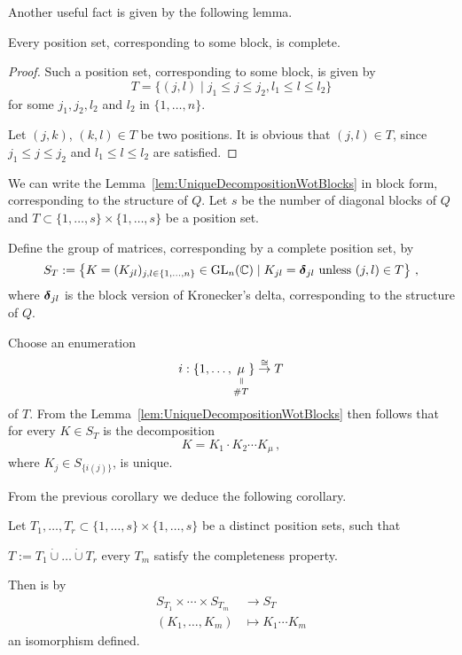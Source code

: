 Another useful fact is given by the following lemma.
\begin{lem}
  Every position set, corresponding to some block, is complete.
\end{lem}
\begin{proof}
  Such a position set, corresponding to some block, is given by
  \[
    T=\{(j,l)\mid j_1\leq j\leq j_2, l_1\leq l\leq l_2\}
  \]
  for some $j_1,j_2,l_2$ and $l_2$ in $\{1,\dots,n\}$.

  Let $(j,k)$, $(k,l)\in T$ be two positions.
  It is obvious that $(j,l)\in T$, since $j_1\leq j\leq j_2$ and
  $l_1\leq l\leq l_2$ are satisfied.
\end{proof}
\begin{cor}
  We can write the Lemma~\ref{lem:UniqueDecompositionWotBlocks} in block form,
  corresponding to the structure of $Q$.
  Let $s$ be the number of diagonal blocks of $Q$ and
  $T\subset\{1,\dots,s\}\times\{1,\dots,s\}$ be a position set.
  \begin{s-defn}
    Define the group of matrices, corresponding by a complete position set, by
    \[
      S_T:=\left\{K=(K_{jl})_{j,l\in\{1,\dots,n\}}\in\operatorname{GL}_n(\mathbb{C})\mid
      K_{jl}=\boldsymbol{\delta}_{jl} \text{~unless~} (j,l)\in T \right\} \,,
    \]
    where $\boldsymbol{\delta}_{jl}$ is the block version of Kronecker's delta,
    corresponding to the structure of $Q$.
  \end{s-defn}
  Choose an enumeration
  \[
    i:\{1,\dots, \underset{\#T}{\underset{%
      \text{\rotatebox[origin=c]{-90}{$=$}}}{\mu}}\}\overset{\cong}{\to}T
  \]
  of $T$.
  From the Lemma~\ref{lem:UniqueDecompositionWotBlocks} then follows that for
  every $K\in S_T$ is the decomposition
  \[
    K=K_1\cdot K_2\cdots K_\mu \,,
  \]
  where $K_j\in S_{\{i(j)\}}$, is unique.
\end{cor}
From the previous corollary we deduce the following corollary.
\begin{cor}\label{cor:composeLevelwise}
  Let $T_1,\dots,T_r\subset\{1,\dots,s\}\times\{1,\dots,s\}$ be a distinct
  position sets, such that
  \begin{einr}
    $T:=T_1\dot\cup\dots\dot\cup T_r$  every $T_m$ satisfy
    the completeness property.
  \end{einr}
  Then is by
  \begin{align*}
    S_{T_1}\times\cdots\times S_{T_m} &\longrightarrow S_T
  \\(K_1,\dots,K_m) &\longmapsto K_1\cdots K_m
  \end{align*}
  an isomorphism defined.
\end{cor}
